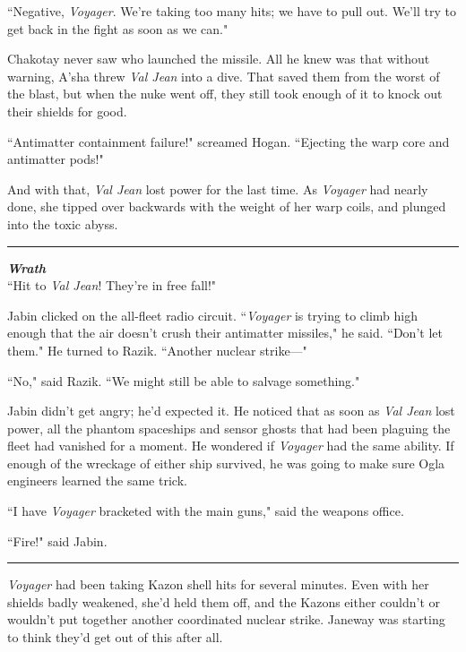 \documentclass[twoside,letterpaper,12pt]{memoir}
\begin{document}
``Negative, \textit{Voyager}. We're taking too many hits; we have to pull out. We'll try to get back in the fight as soon as we can."

Chakotay never saw who launched the missile. All he knew was that without warning, A'sha threw \textit{Val Jean} into a dive. That saved them from the worst of the blast, but when the nuke went off, they still took enough of it to knock out their shields for good.

``Antimatter containment failure!" screamed Hogan. ``Ejecting the warp core and antimatter pods!"

And with that, \textit{Val Jean} lost power for the last time. As \textit{Voyager} had nearly done, she tipped over backwards with the weight of her warp coils, and plunged into the toxic abyss.

\begin{center}\rule{3cm}{0.4 pt}\end{center}

\noindent\textit{\textbf{Wrath}}\\

``Hit to \textit{Val Jean}! They're in free fall!"

Jabin clicked on the all-fleet radio circuit. ``\textit{Voyager} is trying to climb high enough that the air doesn't crush their antimatter missiles," he said. ``Don't let them." He turned to Razik. ``Another nuclear strike---"

``No," said Razik. ``We might still be able to salvage something."

Jabin didn't get angry; he'd expected it. He noticed that as soon as \textit{Val Jean} lost power, all the phantom spaceships and sensor ghosts that had been plaguing the fleet had vanished for a moment. He wondered if \textit{Voyager} had the same ability. If enough of the wreckage of either ship survived, he was going to make sure Ogla engineers learned the same trick.

``I have \textit{Voyager} bracketed with the main guns," said the weapons office.

``Fire!" said Jabin.

\begin{center}\rule{3cm}{0.4 pt}\end{center}

\textit{Voyager} had been taking Kazon shell hits for several minutes. Even with her shields badly weakened, she'd held them off, and the Kazons either couldn't or wouldn't put together another coordinated nuclear strike. Janeway was starting to think they'd get out of this after all.
\end{document}
